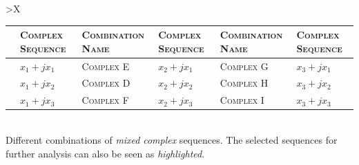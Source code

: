 \documentclass[../../course]{subfiles}
\begin{document}
\begin{center}

    \renewcommand{\arraystretch}{1.5}
    \begin{tabularx} {\textwidth} {
            *{1}{>{\centering\arraybackslash}X}
        }

        {\begin{tabularx} {\textwidth} {
                *{6}{>{\color{black!50}\centering\arraybackslash}m{}}
            }

            \toprule
            {\color{black}\textsc{Combination Name}} & {\color{black}\textsc{Complex Sequence}} &
            {\color{black}\textsc{Combination Name}} & {\color{black}\textsc{Complex Sequence}} &
            {\color{black}\textsc{Combination Name}} & {\color{black}\textsc{Complex Sequence}} \\
            \midrule

            {\color{black}\textsc{Complex A}} & {\color{black}$x_{1} + j x_{1}$} &
            \textsc{Complex E} & $x_{2} + j x_{1}$ &
            \textsc{Complex G} & $x_{3} + j x_{1}$ \\

            {\color{black}\textsc{Complex B}} & {\color{black}$x_{1} + j x_{2}$} &
            \textsc{Complex D} & $x_{2} + j x_{2}$ &
            \textsc{Complex H} & $x_{3} + j x_{2}$ \\

            {\color{black}\textsc{Complex C}} & {\color{black}$x_{1} + j x_{3}$} &
            {\color{black}\textsc{Complex F}} & {\color{black}$x_{2} + j x_{3}$} &
            \textsc{Complex I} & $x_{3} + j x_{3}$ \\

            \bottomrule

        \end{tabularx} } \\

         {
            Different combinations of \emph{mixed} \emph{complex} sequences.
            The selected sequences for further analysis can also be seen as \emph{highlighted}.
        }
        \label{tbl:cplxSeqs}
        \\

    \end{tabularx}

\end{center}

%
\end{document}
